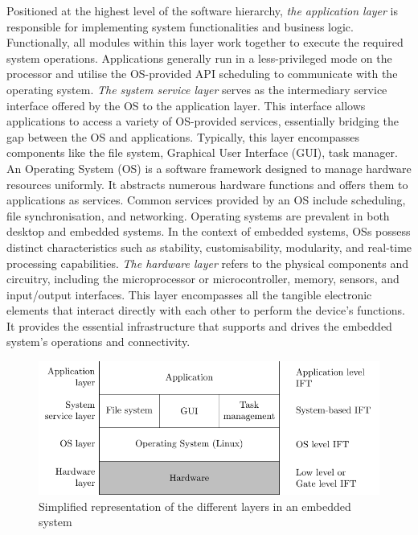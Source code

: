 Positioned at the highest level of the software hierarchy, \textit{the application layer} is responsible for implementing system functionalities and business logic. Functionally, all modules within this layer work together to execute the required system operations. Applications generally run in a less-privileged mode on the processor and utilise the OS-provided API scheduling to communicate with the operating system.
\textit{The system service layer} serves as the intermediary service interface offered by the OS to the application layer. This interface allows applications to access a variety of OS-provided services, essentially bridging the gap between the OS and applications. Typically, this layer encompasses components like the file system, Graphical User Interface (GUI), task manager.
An Operating System (OS) is a software framework designed to manage hardware resources uniformly. It abstracts numerous hardware functions and offers them to applications as services. Common services provided by an OS include scheduling, file synchronisation, and networking. Operating systems are prevalent in both desktop and embedded systems. In the context of embedded systems, OSs possess distinct characteristics such as stability, customisability, modularity, and real-time processing capabilities.
\textit{The hardware layer} refers to the physical components and circuitry, including the microprocessor or microcontroller, memory, sensors, and input/output interfaces. This layer encompasses all the tangible electronic elements that interact directly with each other to perform the device's functions. It provides the essential infrastructure that supports and drives the embedded system’s operations and connectivity.

\begin{figure}[ht]
    \centering
    \includegraphics{c2_soa/img/system_layer.pdf}
    \caption{Simplified representation of the different layers in an embedded system}
    \label{fig:levels_system}
\end{figure}

